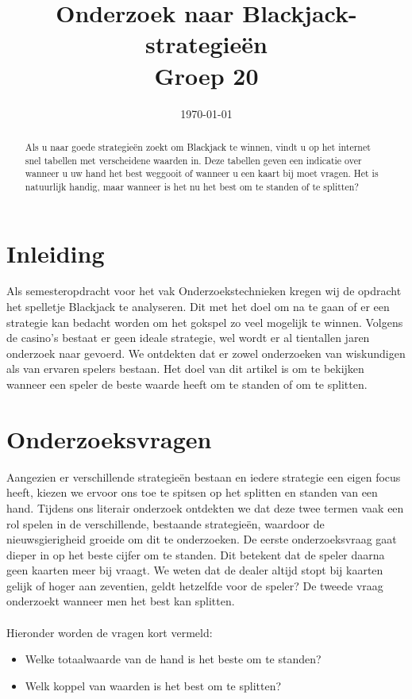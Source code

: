 \documentclass[11pt, final, journal, a4paper]{IEEEtran}
\title{Onderzoek naar Blackjack-strategieën \\ {\large Groep 20}}
\author{\IEEEauthorblockN{Jan {Van Braeckel},}
\and
\IEEEauthorblockN{Annemie {De Groote},}
\and
\IEEEauthorblockN{Lara {Delange},}
\and
\IEEEauthorblockN{Jasper {De Vrient}}}
\date{\today}
\begin{document}
\maketitle

\begin{abstract}
Als u naar goede strategieën zoekt om Blackjack te winnen, vindt u op het internet snel tabellen met verscheidene waarden in. Deze tabellen geven een indicatie over wanneer u uw hand het best weggooit of wanneer u een kaart bij moet vragen. Het is natuurlijk handig, maar wanneer is het nu het best om te standen of te splitten?
\end{abstract}

\section{Inleiding}
Als semesteropdracht voor het vak Onderzoekstechnieken kregen wij de opdracht het spelletje Blackjack te analyseren. Dit met het doel om na te gaan of er een strategie kan bedacht worden om het gokspel zo veel mogelijk te winnen. Volgens de casino's bestaat er geen ideale strategie, wel wordt er al tientallen jaren onderzoek naar gevoerd. We ontdekten dat er zowel onderzoeken van wiskundigen als van ervaren spelers bestaan. Het doel van dit artikel is om te bekijken wanneer een speler de beste waarde heeft om te standen of om te splitten.

\section{Onderzoeksvragen}
Aangezien er verschillende strategieën bestaan en iedere strategie een eigen focus heeft, kiezen we ervoor ons toe te spitsen op het splitten en standen van een hand. Tijdens ons literair onderzoek ontdekten we dat deze twee termen vaak een rol spelen in de verschillende, bestaande strategieën, waardoor de nieuwsgierigheid groeide om dit te onderzoeken. 
De eerste onderzoeksvraag gaat dieper in op het beste cijfer om te standen. Dit betekent dat de speler daarna geen kaarten meer bij vraagt. We weten dat de dealer altijd stopt bij kaarten gelijk of hoger aan zeventien, geldt hetzelfde voor de speler? De tweede vraag onderzoekt wanneer men het best kan splitten.
\\\\
Hieronder worden de vragen kort vermeld:
\begin{itemize}
	\item Welke totaalwaarde van de hand is het beste om te standen?
	\item Welk koppel van waarden is het best om te splitten?
\end{itemize}
\end{document}

